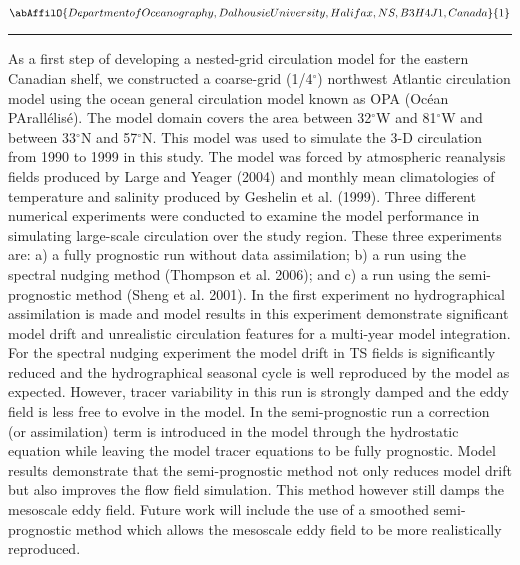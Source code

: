\begin{center}
   \vspace{2 mm} \begin{center}
    \vspace{2 mm}\begin{center}
  
  $\abAffilO{Department of Oceanography, Dalhousie University, Halifax, NS, B3H 4J1, Canada}{1}$

  \end{center}
  \vspace{2 mm}
  \end{center}\end{center}
  \begin{center}\rule{0.70\linewidth}{0.5 pt}\end{center}

\noindent As a first step of developing a nested-grid circulation model for the eastern Canadian shelf, we constructed a coarse-grid (1/4$^\circ$) northwest Atlantic circulation model using the ocean general circulation model known as OPA (Oc\'{e}an PArall\'{e}lis\'{e}). The model domain covers the area between 32$^\circ$W and 81$^\circ$W and between 33$^\circ$N and 57$^\circ$N. This model was used to simulate the 3-D circulation from 1990 to 1999 in this study. The model was forced by atmospheric reanalysis fields produced by Large and Yeager (2004) and monthly mean climatologies of temperature and salinity produced by Geshelin et al. (1999). Three different numerical experiments were conducted to examine the model performance in simulating large-scale circulation over the study region. These three experiments are: a) a fully prognostic run without data assimilation; b) a run using the spectral nudging method (Thompson et al. 2006); and c) a run using the semi-prognostic method (Sheng et al. 2001). In the first experiment no hydrographical assimilation is made and model results in this experiment demonstrate significant model drift and unrealistic circulation features for a multi-year model integration. For the spectral nudging experiment the model drift in TS fields is significantly reduced and the hydrographical seasonal cycle is well reproduced by the model as expected. However, tracer variability in this run is strongly damped and the eddy field is less free to evolve in the model. In the semi-prognostic run a correction (or assimilation) term is introduced in the model through the hydrostatic equation while leaving the model tracer equations to be fully prognostic. Model results demonstrate that the semi-prognostic method not only reduces model drift but also improves the flow field simulation. This method however still damps the mesoscale eddy field. Future work will include the use of a smoothed semi-prognostic method which allows the mesoscale eddy field to be more realistically reproduced.

